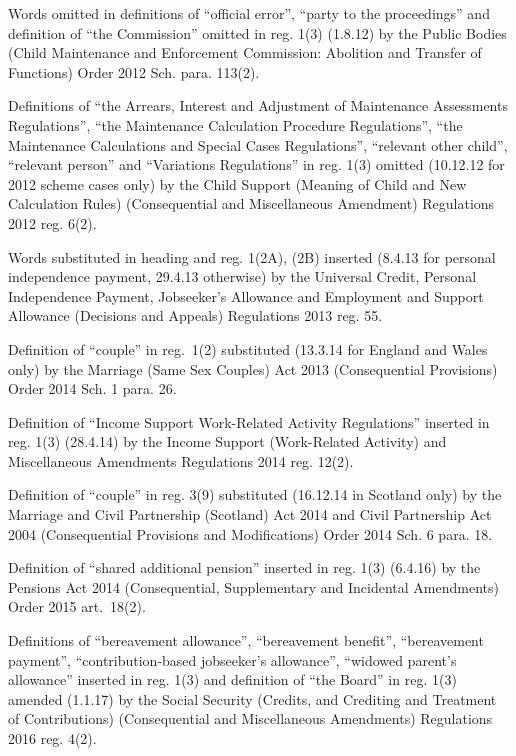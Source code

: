 \documentclass[12pt,a4paper]{article}
\begin{document}
{Words omitted in definitions of ``official error'', ``party to the proceedings'' and definition of ``the Commission'' omitted in reg. 1(3) (1.8.12) by the Public Bodies (Child Maintenance and Enforcement Commission: Abolition and Transfer of Functions) Order 2012 Sch. para. 113(2).

Definitions of ``the Arrears, Interest and Adjustment of Maintenance Assessments Regulations'', ``the Maintenance Calculation Procedure Regulations'', ``the Maintenance Calculations and Special Cases Regulations'', ``relevant other child'', ``relevant person'' and ``Variations Regulations'' in reg. 1(3) omitted (10.12.12 for 2012 scheme cases only) by the Child Support (Meaning of Child and New Calculation Rules) (Consequential and Miscellaneous Amendment) Regulations 2012 reg. 6(2).

Words substituted in heading and reg. 1(2A), (2B) inserted (8.4.13 for personal independence payment, 29.4.13 otherwise) by the Universal Credit, Personal Independence Payment, Jobseeker's Allowance and Employment and Support Allowance (Decisions and Appeals) Regulations 2013 reg. 55.

Definition of ``couple'' in reg.~1(2) substituted (13.3.14 for England and Wales only) by the Marriage (Same Sex Couples) Act 2013 (Consequential Provisions) Order 2014 Sch. 1 para. 26.

Definition of ``Income Support Work-Related Activity Regulations'' inserted in reg. 1(3) (28.4.14) by the Income Support (Work-Related Activity) and Miscellaneous Amendments Regulations 2014 reg. 12(2).

Definition of ``couple'' in reg. 3(9) substituted (16.12.14 in Scotland only) by the Marriage and Civil Partnership (Scotland) Act 2014 and Civil Partnership Act 2004 (Consequential Provisions and Modifications) Order 2014 Sch. 6 para. 18.

Definition of ``shared additional pension'' inserted in reg. 1(3) (6.4.16) by the Pensions Act 2014 (Consequential, Supplementary and Incidental Amendments) Order 2015 art.~18(2).

Definitions of ``bereavement allowance'', ``bereavement benefit'', ``bereavement payment'', ``contribution-based jobseeker's allowance'', ``widowed parent's allowance'' inserted in reg. 1(3) and definition of ``the Board'' in reg. 1(3) amended (1.1.17) by the Social Security (Credits, and Crediting and Treatment of Contributions) (Consequential and Miscellaneous Amendments) Regulations 2016 reg. 4(2).
}
\end{document}
